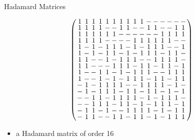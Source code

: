 \documentclass{beamer}
\begin{document}
\begin{frame}{Hadamard Matrices}

  \[
    \arraycolsep=1.0pt\def\arraystretch{0.75}
    \left(\begin{array}{cccccccccccccccc}
            1&1&1&1&1&1&1&1&1&1&-&-&-&-&-&-\\
            1&1&1&1&-&-&1&1&-&-&1&1&-&-&1&1\\
            1&1&1&1&1&1&-&-&-&-&-&-&1&1&1&1\\
            1&1&1&1&-&-&-&-&1&1&1&1&1&1&-&-\\
            1&-&1&-&1&1&1&-&1&-&1&1&1&-&-&1\\
            1&-&1&-&1&1&-&1&-&1&1&1&-&1&1&-\\
            1&1&-&-&1&-&1&1&1&-&-&1&1&1&1&-\\
            1&1&-&-&-&1&1&1&-&1&1&-&1&1&-&1\\
            1&-&-&1&1&-&1&-&1&1&1&-&-&1&1&1\\
            1&-&-&1&-&1&-&1&1&1&-&1&1&-&1&1\\
            -&1&-&1&1&1&1&-&-&1&1&1&1&-&1&-\\
            -&1&-&1&1&1&-&1&1&-&1&1&-&1&-&1\\
            -&-&1&1&-&1&1&1&1&-&1&-&1&1&1&-\\
            -&-&1&1&1&-&1&1&-&1&-&1&1&1&-&1\\
            -&1&1&-&1&-&-&1&1&1&1&-&1&-&1&1\\
            -&1&1&-&-&1&1&-&1&1&-&1&-&1&1&1\\
    \end{array}\right)
  \]

  \begin{itemize}
    \item a Hadamard matrix of order 16
  \end{itemize}
  
\end{frame}
\end{document}

